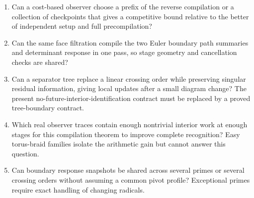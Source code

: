 \begin{enumerate}
\item Can a cost-based observer choose a prefix of the reverse compilation
      or a collection of checkpoints that gives a competitive bound relative
      to the better of independent setup and full precompilation?
\item Can the same face filtration compile the two Euler boundary path
      summaries and determinant response in one pass, so stage geometry and
      cancellation checks are shared?
\item Can a separator tree replace a linear crossing order while preserving
      singular residual information, giving local updates after a small
      diagram change?  The present no-future-interior-identification contract
      must be replaced by a proved tree-boundary contract.
\item Which real observer traces contain enough nontrivial interior work
      at enough stages for this compilation theorem to improve complete
      recognition?  Easy torus-braid families isolate the arithmetic gain
      but cannot answer this question.
\item Can boundary response snapshots be shared across several primes or
      several crossing orders without assuming a common pivot profile?
      Exceptional primes require exact handling of changing radicals.
\end{enumerate}
